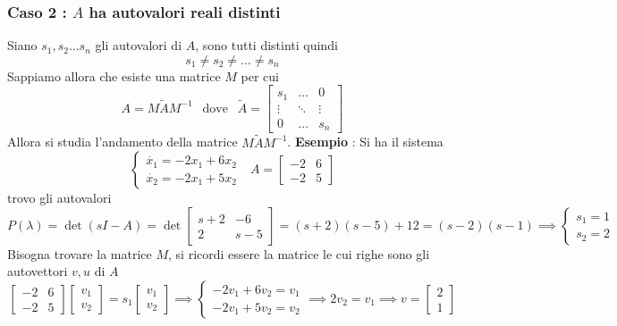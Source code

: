 \documentclass[10pt, letterpaper]{report}
\begin{document}
\subsubsection{Caso 2 : $A$ ha autovalori reali distinti}
Siano $s_1,s_2\dots s_n$ gli autovalori di $A$, sono tutti distinti quindi $$ s_1\ne s_2 \ne \dots \ne s_n$$
Sappiamo allora che esiste una matrice $M$ per cui 
$$ A=M\tilde A M^{-1}  \ \ \text{ dove } \ \ \tilde A = \begin{bmatrix}
    s_1 &\dots &0\\ 
    \vdots & \ddots & \vdots \\ 
    0 & \dots & s_n 
\end{bmatrix}$$
Allora si studia l'andamento della matrice $M\tilde A M^{-1}$.\acc 
\textbf{Esempio} : Si ha il sistema 
$$ \begin{cases}
    \dot{x_1}=-2x_1+6x_2\\ \dot{x_2}=-2x_1+5x_2
\end{cases} \ \ \ A=\begin{bmatrix}
    -2&6\\-2&5
\end{bmatrix}$$
trovo gli autovalori 
$$ P(\lambda)=\det(sI-A)=\det\begin{bmatrix}
    s+2&-6\\2&s-5
\end{bmatrix}=(s+2)(s-5)+12=(s-2)(s-1)\implies \begin{cases}
    s_1=1\\ s_2=2
\end{cases}$$ 
Bisogna trovare la matrice $M$, si ricordi essere la matrice le cui righe sono gli autovettori $v,u$ di $A$  
$$
\begin{bmatrix}
    -2&6\\-2&5
\end{bmatrix}\begin{bmatrix}
    v_1\\v_2
\end{bmatrix}=s_1\begin{bmatrix}
    v_1\\v_2
\end{bmatrix}\implies \begin{cases}
    -2v_1+6v_2=v_1\\ -2v_1+5v_2=v_2
\end{cases}\implies 
    2v_2=v_1 \implies v = \begin{bmatrix}
        2\\1
    \end{bmatrix}
$$
\end{document}
